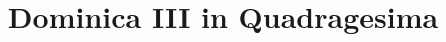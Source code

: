 \documentclass[17pt]{extarticle}
\begin{document}
\title{Dominica III in Quadragesima}
\makereadingtitle

\end{document}
